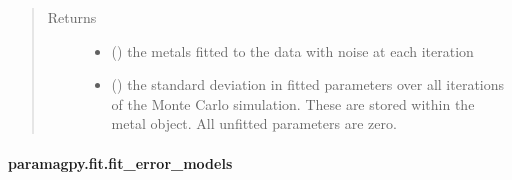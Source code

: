 \documentclass[a4paper,10pt,english,openany,oneside]{sphinxmanual}
\begin{document}
\begin{fulllineitems}
\begin{quote}
\begin{description}
\begin{itemize}
\end{itemize}

\item[{Returns}] \leavevmode
\begin{itemize}
\item {} 
 () \textendash{} the metals fitted to the data with noise at each iteration

\item {} 
 () \textendash{} the standard deviation in fitted parameters over all iterations of the
Monte Carlo simulation.
These are stored within the metal object. All unfitted parameters
are zero.

\end{itemize}


\end{description}\end{quote}

\end{fulllineitems}



\paragraph{paramagpy.fit.fit\_error\_models}
\label{\detokenize{reference/generated/paramagpy.fit.fit_error_models:paramagpy-fit-fit-error-models}}\label{\detokenize{reference/generated/paramagpy.fit.fit_error_models::doc}}
\end{document}
